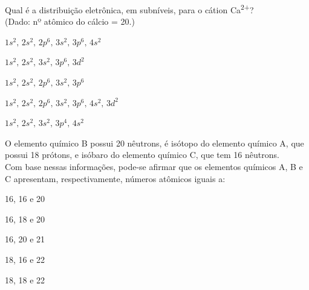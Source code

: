 \questao %
Qual é a distribuição eletrônica, em subníveis, para o cátion Ca\textsuperscript{2+}?\\
(Dado: nº atômico do cálcio = 20.)
\begin{alternativas}
\item $1s^2, \, 2s^2, \, 2p^6, \, 3s^2, \, 3p^6, \, 4s^2$
\item $1s^2, \, 2s^2,\, 3s^2, \, 3p^6, \, 3d^2$
\item $1s^2, \, 2s^2,\, 2p^6, \, 3s^2, \, 3p^6$
\item $1s^2, \, 2s^2,\, 2p^6, \, 3s^2, \, 3p^6, \, 4s^2, \, 3d^2$
\item $1s^2, \, 2s^2,\, 3s^2, \, 3p^4, \, 4s^2$
\end{alternativas}

\questao %
O elemento químico B possui 20 nêutrons, é isótopo do elemento químico A, que possui 18 prótons, e isóbaro do elemento químico C, que tem 16 nêutrons. \\
Com base nessas informações, pode-se afirmar que os elementos químicos A, B e C apresentam, respectivamente, números atômicos iguais a:
\begin{alternativas}
\item 16, 16 e 20 
\item 16, 18 e 20 
\item 16, 20 e 21
\item 18, 16 e 22 
\item 18, 18 e 22
\end{alternativas}

%
%

